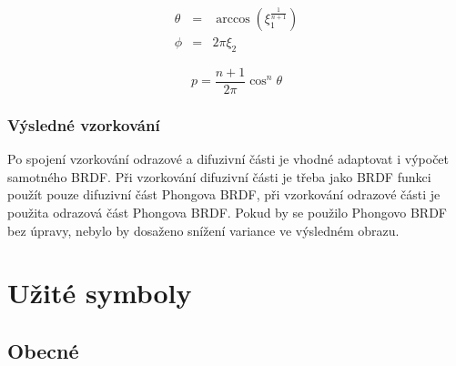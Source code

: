 \documentclass[czech,master]{diploma}
\newcommand{\randU}{\xi_{1}}
\newcommand{\randV}{\xi_{2}}
\begin{document}
\begin{eqnarray}
  \theta & = & \arccos(\randU^{\frac{1}{n+1}}) \nonumber \\
  \phi & = & 2\pi\randV\label{eq:phongSpecularSample}
\end{eqnarray}

\begin{equation} \label{eq:phongSpecularSamplePdf}
  p = \frac{n+1}{2\pi}\cos^n\theta
\end{equation}

\subsection{Výsledné vzorkování}
Po spojení vzorkování odrazové a difuzivní části je vhodné adaptovat i výpočet samotného BRDF. Při vzorkování difuzivní části je třeba jako BRDF funkci použít pouze difuzivní část Phongova BRDF, při vzorkování odrazové části je použita odrazová část Phongova BRDF. Pokud by se použilo Phongovo BRDF bez úpravy, nebylo by dosaženo snížení variance ve výsledném obrazu. \cite{KrivanekBRDFIBL}

\printbibliography[title={Literatura}, heading=bibintoc]

\appendix
\chapter{Užité symboly}

\section{Obecné}
\end{document}

